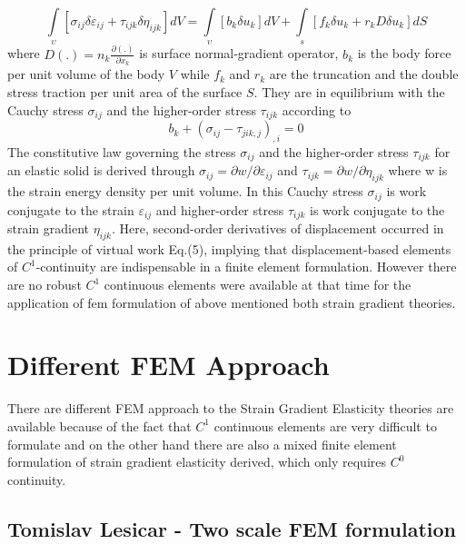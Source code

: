 \documentclass[12pt]{article}
\begin{document}
\begin{equation}
\int\limits_\upsilon\! [\sigma_{ij} \delta\varepsilon_{ij} + \tau_{ijk}\delta\eta_{ijk}]  dV = \int\limits_\upsilon\! [b_k\delta u_k] dV + \int\limits_s \! [f_k\delta u_k+r_kD\delta u_k]dS
\end{equation}
where $D(.) = n_k\frac{\partial(.)}{\partial x_k}$ is surface normal-gradient operator, $b_k$ is the body force per unit volume
of the body $V$ while $f_k$ and $r_k$ are the truncation and the double stress traction per unit area of the surface $S$. They are in equilibrium with the Cauchy stress $\sigma_{ij}$ and the higher-order stress $\tau_{ijk}$ according to
\begin{equation}
b_k + (\sigma_{ij}-\tau_{jik,j})_{,i} = 0
\end{equation}
The constitutive law governing the stress $\sigma_{ij}$ and the higher-order stress $\tau_{ijk}$ for an elastic solid is derived through $\sigma_{ij} = \partial w / \partial \varepsilon_{ij}$ and $\tau_{ijk}= \partial w / \partial \eta_{ijk}$ where w is the strain energy density per unit volume. In this Cauchy stress $\sigma_{ij}$ is work conjugate to the strain $\varepsilon_{ij}$ and higher-order stress $\tau_{ijk}$ is work conjugate to the strain gradient  $\eta_{ijk}$.
\newline
\newline
Here, second-order derivatives of displacement occurred in the principle of virtual work Eq.(5), implying that displacement-based elements of $C^1$-continuity are indispensable in a finite element formulation. However there are no robust $C^1$ continuous elements were available at that time for the application of fem formulation of above mentioned both strain gradient theories.

\section{Different FEM Approach}
There are different FEM approach to the Strain Gradient Elasticity theories are available because of the fact that $C^1$ continuous elements are very difficult to formulate and on the other hand there are also a mixed finite element formulation of strain gradient elasticity derived, which only requires $C^0$ continuity.

\subsection{Tomislav Lesicar - Two scale FEM formulation} 
\end{document}
